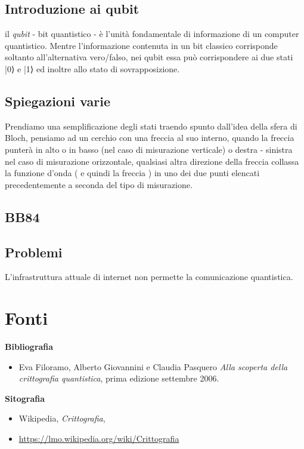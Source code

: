 \documentclass[a4paper, 12pt]{article}
\begin{document}
\subsection{Introduzione ai qubit}
il \textit{qubit} - bit quantistico - è l'unità fondamentale di informazione di un computer quantistico.
Mentre l'informazione contenuta in un bit classico corrisponde soltanto all'alternativa vero/falso, nei qubit essa può corrispondere ai due stati |0⟩ e |1⟩ ed inoltre allo stato di sovrapposizione.
\subsection{Spiegazioni varie}
Prendiamo una semplificazione degli stati traendo spunto dall'idea della sfera di Bloch, pensiamo ad un cerchio con una freccia al suo interno, quando la freccia punterà in alto o in basso (nel caso di misurazione verticale) o destra - sinistra nel caso di misurazione orizzontale, qualsiasi altra direzione della freccia collassa la funzione d'onda ( e quindi la freccia ) in uno dei due punti elencati precedentemente a seconda del tipo di misurazione.
\subsection{BB84}
\subsection{Problemi}
L'infrastruttura attuale di internet non permette la comunicazione quantistica.


\clearpage

\section{Fonti}

{\large \textbf{Bibliografia}\par}
\begin{itemize}
    \item Eva Filoramo, Alberto Giovannini e Claudia Pasquero \textit{Alla scoperta della crittografia quantistica}, prima edizione settembre 2006.
\end{itemize}

{\large \textbf{Sitografia}\par}
\begin{itemize}
    \item Wikipedia, \textit{Crittografia}, 
    \item[] \href{https://lmo.wikipedia.org/wiki/Crittografia}{https://lmo.wikipedia.org/wiki/Crittografia}
\end{itemize}
\end{document}

